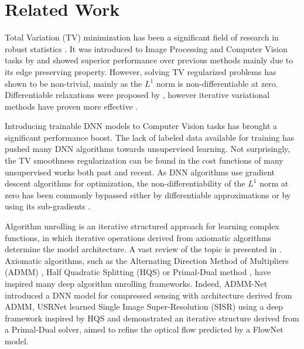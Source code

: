 \documentclass[10pt,twocolumn,letterpaper]{article}
\begin{document}
 \section{Related Work}

Total Variation (TV) minimization has been a significant field of research in robust statistics \cite{Huber.Wiley.ea1981Robuststatistics}. It was introduced to Image Processing and Computer Vision tasks by \cite{RUDIN1992259} and showed superior performance over previous methods mainly due to its edge preserving property. However, solving TV regularized problems has shown to be non-trivial, mainly as the $L^1$ norm is non-differentiable at zero. Differentiable relaxations were proposed by \cite{huber1964robust,charbonnier1997deterministic,Chambolle1997ImageRV}, however iterative variational methods have proven more effective \cite{doi:10.1080/00207160500069904,zach2007duality,admm0}.

Introducing trainable DNN models to Computer Vision tasks has brought a significant performance boost. The lack of labeled data available for training has pushed many DNN algorithms towards unsupervised learning. Not surprisingly, the TV smoothness regularization can be found in the cost functions of many unsupervised works both past and recent. As DNN algorithms use gradient descent algorithms for optimization, the non-differentiability of the $L^1$ norm at zero has been commonly bypassed either by differentiable approximations \cite{meister2017unflow} or by using its sub-gradients \nolinebreak \cite{kim2020unsupervised,jonschkowski2020matters,luo2021upflow}.

Algorithm unrolling is an iterative structured approach for learning complex functions, in which iterative operations derived from axiomatic algorithms determine the model architecture. A vast review of the topic is presented in \cite{monga2019algorithm}. Axiomatic algorithms, such as the Alternating Direction Method of Multipliers (ADMM) \cite{admm0}, Half Quadratic Splitting (HQS) \cite{5445028} or Primal-Dual method \cite{chambolle2011first}, have inspired many deep algorithm unrolling frameworks. Indeed, ADMM-Net \cite{sun2016deep} introduced a DNN model for compressed sensing with architecture derived from ADMM, USRNet \cite{zhang2020deep} learned Single Image Super-Resolution (SISR) using a deep framework inspired by HQS and \cite{wang2016proximal} demonstrated an iterative structure derived from a Primal-Dual solver, aimed to refine the optical flow predicted by a FlowNet \cite{dosovitskiy2015flownet} model. 
\end{document}

